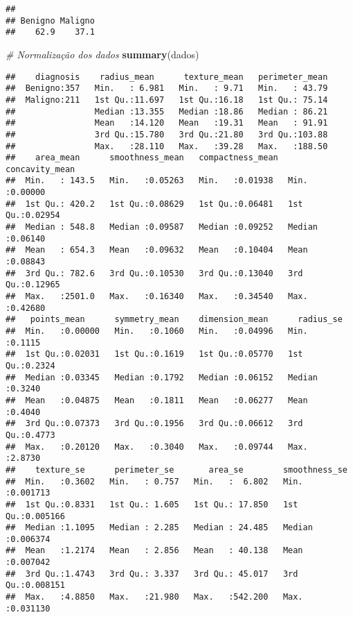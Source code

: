 \documentclass[]{article}
\newenvironment{Shaded}{\begin{snugshade}}{\end{snugshade}}
\newcommand{\KeywordTok}[1]{\textcolor[rgb]{0.13,0.29,0.53}{\textbf{#1}}}
\newcommand{\CommentTok}[1]{\textcolor[rgb]{0.56,0.35,0.01}{\textit{#1}}}
\newcommand{\NormalTok}[1]{#1}
\begin{document}
\begin{verbatim}
## 
## Benigno Maligno 
##    62.9    37.1
\end{verbatim}

\begin{Shaded}
\begin{Highlighting}[]
\CommentTok{# Normalização dos dados}
\KeywordTok{summary}\NormalTok{(dados)}
\end{Highlighting}
\end{Shaded}

\begin{verbatim}
##    diagnosis    radius_mean      texture_mean   perimeter_mean  
##  Benigno:357   Min.   : 6.981   Min.   : 9.71   Min.   : 43.79  
##  Maligno:211   1st Qu.:11.697   1st Qu.:16.18   1st Qu.: 75.14  
##                Median :13.355   Median :18.86   Median : 86.21  
##                Mean   :14.120   Mean   :19.31   Mean   : 91.91  
##                3rd Qu.:15.780   3rd Qu.:21.80   3rd Qu.:103.88  
##                Max.   :28.110   Max.   :39.28   Max.   :188.50  
##    area_mean      smoothness_mean   compactness_mean  concavity_mean   
##  Min.   : 143.5   Min.   :0.05263   Min.   :0.01938   Min.   :0.00000  
##  1st Qu.: 420.2   1st Qu.:0.08629   1st Qu.:0.06481   1st Qu.:0.02954  
##  Median : 548.8   Median :0.09587   Median :0.09252   Median :0.06140  
##  Mean   : 654.3   Mean   :0.09632   Mean   :0.10404   Mean   :0.08843  
##  3rd Qu.: 782.6   3rd Qu.:0.10530   3rd Qu.:0.13040   3rd Qu.:0.12965  
##  Max.   :2501.0   Max.   :0.16340   Max.   :0.34540   Max.   :0.42680  
##   points_mean      symmetry_mean    dimension_mean      radius_se     
##  Min.   :0.00000   Min.   :0.1060   Min.   :0.04996   Min.   :0.1115  
##  1st Qu.:0.02031   1st Qu.:0.1619   1st Qu.:0.05770   1st Qu.:0.2324  
##  Median :0.03345   Median :0.1792   Median :0.06152   Median :0.3240  
##  Mean   :0.04875   Mean   :0.1811   Mean   :0.06277   Mean   :0.4040  
##  3rd Qu.:0.07373   3rd Qu.:0.1956   3rd Qu.:0.06612   3rd Qu.:0.4773  
##  Max.   :0.20120   Max.   :0.3040   Max.   :0.09744   Max.   :2.8730  
##    texture_se      perimeter_se       area_se        smoothness_se     
##  Min.   :0.3602   Min.   : 0.757   Min.   :  6.802   Min.   :0.001713  
##  1st Qu.:0.8331   1st Qu.: 1.605   1st Qu.: 17.850   1st Qu.:0.005166  
##  Median :1.1095   Median : 2.285   Median : 24.485   Median :0.006374  
##  Mean   :1.2174   Mean   : 2.856   Mean   : 40.138   Mean   :0.007042  
##  3rd Qu.:1.4743   3rd Qu.: 3.337   3rd Qu.: 45.017   3rd Qu.:0.008151  
##  Max.   :4.8850   Max.   :21.980   Max.   :542.200   Max.   :0.031130  

\end{verbatim}
\end{document}
